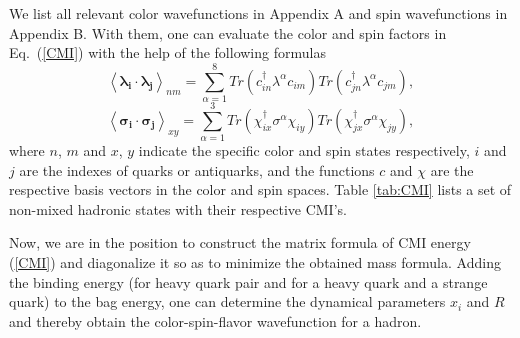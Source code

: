 \documentclass[prt,twocolumn,floatfix,nofootinbib]{revtex4}
\begin{document}
We list all relevant color wavefunctions in Appendix A and spin wavefunctions in Appendix B. With them, one can evaluate the color and spin factors in Eq.~(\ref{CMI}) with the help of the following formulas
\begin{equation}\label{colorfc}
    {\left\langle \boldsymbol{\lambda_{i}}\cdot \boldsymbol{\lambda_{j}} \right\rangle}_{nm}=
    \sum_{\alpha=1}^{8} Tr\left(c_{in}^{\dagger}\lambda^{\alpha}c_{im}\right) Tr\left(c_{jn}^{\dagger}\lambda^{\alpha}c_{jm}\right),
\end{equation}
\begin{equation}\label{spinfc}
    {\left\langle \boldsymbol{\sigma_{i}}\cdot \boldsymbol{\sigma_{j}} \right\rangle}_{xy}=
    \sum_{\alpha=1}^{3} Tr\left(\chi_{ix}^{\dagger}\sigma^{\alpha}\chi_{iy}\right) Tr\left(\chi_{jx}^{\dagger}\sigma^{\alpha}\chi_{jy}\right),
\end{equation}
where $n$, $m$ and $x$, $y$ indicate the specific color and spin states respectively, $i$ and $j$ are the indexes of quarks or antiquarks, and the functions $c$ and $\chi$ are the respective basis vectors in the color and spin spaces. Table \ref{tab:CMI} lists a set of non-mixed hadronic states with their respective CMI's.

Now, we are in the position to construct the matrix formula of CMI energy (\ref{CMI}) and diagonalize it so as to minimize the obtained mass formula.
Adding the binding energy (for heavy quark pair and for a heavy quark and a strange quark) to the bag energy, one can determine the dynamical parameters $x_{i}$ and $R$ and thereby obtain the color-spin-flavor wavefunction for a hadron.
\end{document}
